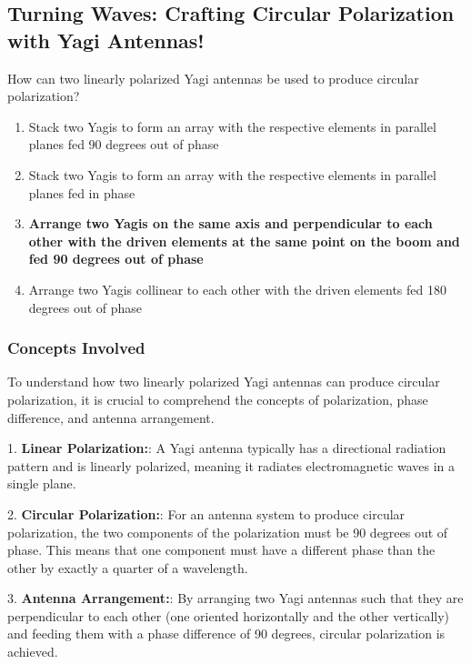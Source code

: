 \subsection{Turning Waves: Crafting Circular Polarization with Yagi Antennas!}

\begin{tcolorbox}[colback=gray!10, colframe=black, title=E9D02] How can two linearly polarized Yagi antennas be used to produce circular polarization?
\begin{enumerate}[label=\Alph*.]
    \item Stack two Yagis to form an array with the respective elements in parallel planes fed 90 degrees out of phase
    \item Stack two Yagis to form an array with the respective elements in parallel planes fed in phase
    \item \textbf{Arrange two Yagis on the same axis and perpendicular to each other with the driven elements at the same point on the boom and fed 90 degrees out of phase}
    \item Arrange two Yagis collinear to each other with the driven elements fed 180 degrees out of phase
\end{enumerate} \end{tcolorbox}

\subsubsection*{Concepts Involved}

To understand how two linearly polarized Yagi antennas can produce circular polarization, it is crucial to comprehend the concepts of polarization, phase difference, and antenna arrangement.

1. \textbf{Linear Polarization:}: A Yagi antenna typically has a directional radiation pattern and is linearly polarized, meaning it radiates electromagnetic waves in a single plane.

2. \textbf{Circular Polarization:}: For an antenna system to produce circular polarization, the two components of the polarization must be 90 degrees out of phase. This means that one component must have a different phase than the other by exactly a quarter of a wavelength.

3. \textbf{Antenna Arrangement:}: By arranging two Yagi antennas such that they are perpendicular to each other (one oriented horizontally and the other vertically) and feeding them with a phase difference of 90 degrees, circular polarization is achieved. 

